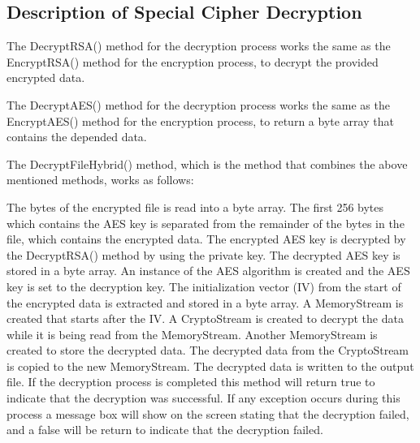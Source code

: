\documentclass[a4paper,oneside,11pt]{book}
\begin{document}
\subsection{Description of Special Cipher Decryption}

The DecryptRSA() method for the decryption process works the same as the EncryptRSA() method for the encryption process, to decrypt the provided encrypted data.

The DecryptAES() method for the decryption process works the same as the EncryptAES() method for the encryption process, to return a byte array that contains the depended data.

The DecryptFileHybrid() method, which is the method that combines the above mentioned methods, works as follows:

The bytes of the encrypted file is read into a byte array. The first 256 bytes which contains the AES key is separated from the remainder of the bytes in the file, which contains the encrypted data. The encrypted AES key is decrypted by the DecryptRSA() method by using the private key. The decrypted AES key is stored in a byte array. An instance of the AES algorithm is created and the AES key is set to the decryption key. The initialization vector (IV) from the start of the encrypted data is extracted and stored in a byte array. A MemoryStream is created that starts after the IV. A CryptoStream is created to decrypt the data while it is being read from the MemoryStream. Another MemoryStream is created to store the decrypted data. The decrypted data from the CryptoStream is copied to the new MemoryStream. The decrypted data is written to the output file. If the decryption process is completed this method will return true to indicate that the decryption was successful. If any exception occurs during this process a message box will show on the screen stating that the decryption failed, and a false will be return to indicate that the decryption failed.
\end{document}
